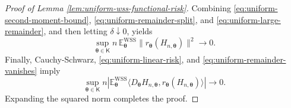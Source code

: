 \documentclass{article}
\theoremstyle{named}
\theoremstyle{named1}
\newcommand{\E}{\mathbb{E}}
\newcommand{\WSS}{\mathrm{WSS}}
\newcommand{\btheta}{\boldsymbol{\theta}}
\theoremstyle{plain}
\theoremstyle{remark}
\begin{document}
\begin{proof}[Proof of Lemma \ref{lem:uniform-wss-functional-risk}]
Combining \eqref{eq:uniform-second-moment-bound},
\eqref{eq:uniform-remainder-split}, and
\eqref{eq:uniform-large-remainder}, and then letting
\(\delta\downarrow0\), yields
\begin{equation}
    \sup_{\btheta\in\mathsf K}
    n\,\E_{\btheta}^{\WSS}
      \|r_{\btheta}(H_{n,\btheta})\|^2
    \rightarrow0.
\label{eq:uniform-remainder-vanishes}
\end{equation}
Finally, Cauchy-Schwarz, \eqref{eq:uniform-linear-risk}, and
\eqref{eq:uniform-remainder-vanishes} imply
\[
    \sup_{\btheta\in\mathsf K}
    n\left|
      \E_{\btheta}^{\WSS}
      \langle D_{\btheta}H_{n,\btheta},
              r_{\btheta}(H_{n,\btheta})\rangle
    \right|
    \rightarrow0.
\]
Expanding the squared norm completes the proof.
\end{proof}
\end{document}
